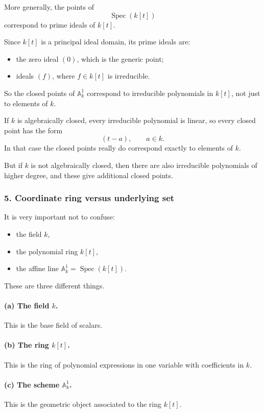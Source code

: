 \documentclass[12pt,a4paper]{article}
\theoremstyle{plain}
\theoremstyle{definition}      %
\begin{document}
	More generally, the points of
	\[
	\operatorname{Spec}(k[t])
	\]
	correspond to prime ideals of \(k[t]\).
	
	Since \(k[t]\) is a principal ideal domain, its prime ideals are:
	\begin{itemize}
		\item the zero ideal \((0)\), which is the generic point;
		\item ideals \((f)\), where \(f\in k[t]\) is irreducible.
	\end{itemize}
	
	So the closed points of \(\mathbb A^1_k\) correspond to irreducible polynomials in \(k[t]\), not just to elements of \(k\).
	
	If \(k\) is algebraically closed, every irreducible polynomial is linear, so every closed point has the form
	\[
	(t-a),\qquad a\in k.
	\]
	In that case the closed points really do correspond exactly to elements of \(k\).
	
	But if \(k\) is not algebraically closed, then there are also irreducible polynomials of higher degree, and these give additional closed points.
	
	\subsubsection*{5. Coordinate ring versus underlying set}
	
	It is very important not to confuse:
	\begin{itemize}
		\item the field \(k\),
		\item the polynomial ring \(k[t]\),
		\item the affine line \(\mathbb A^1_k=\operatorname{Spec}(k[t])\).
	\end{itemize}
	
	These are three different things.
	
	\paragraph{(a) The field \(k\).}
	This is the base field of scalars.
	
	\paragraph{(b) The ring \(k[t]\).}
	This is the ring of polynomial expressions in one variable with coefficients in \(k\).
	
	\paragraph{(c) The scheme \(\mathbb A^1_k\).}
	This is the geometric object associated to the ring \(k[t]\).
	
\end{document}
